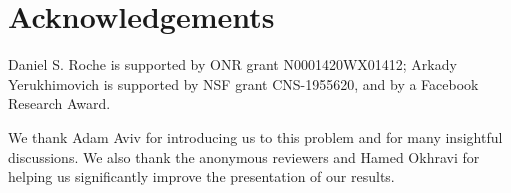 \section*{Acknowledgements}
Daniel S. Roche is supported by ONR grant N0001420WX01412; Arkady Yerukhimovich is supported by NSF grant CNS-1955620, and by a Facebook Research Award. 

We thank Adam Aviv for introducing us to this problem and for many insightful discussions.  We also thank the anonymous reviewers and Hamed Okhravi for helping us significantly improve the presentation of our results.

%
%

